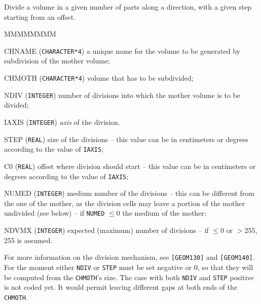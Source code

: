                


Divide a volume in a given number of parts along a direction, with
a given step starting from an offset.

\begin{DLtt}{MMMMMMMM}
\item[CHNAME] ({\tt CHARACTER*4}) a unique name for the volume to be generated
by subdivision of the mother volume;
\item[CHMOTH] ({\tt CHARACTER*4}) volume that has to be subdivided;
\item[NDIV] ({\tt INTEGER}) number of divisions into which the mother volume
is to be divided;
\item[IAXIS] ({\tt INTEGER}) {\it axis} of the division.
\item[STEP] ({\tt REAL}) size of the divisions -- this value can be in
centimeters or degrees according to the value of {\tt IAXIS};
\item[C0] ({\tt REAL}) offset where division should start -- this value can be 
in centimeters or degrees according to the value of {\tt IAXIS};
\item[NUMED] ({\tt INTEGER}) medium number of the divisions -- this can be
different from the one of the mother, as the division cells may leave a
portion of the mother undivided (see below) --
if {\tt NUMED} $\leq 0$  the medium of the mother;
\item[NDVMX] ({\tt INTEGER}) expected (maximum) number of divisions -- if
$ \leq 0 $ or $ > 255 $, 255 is assumed.
\end{DLtt}

For more information on the division mechanism, see {\tt [GEOM130]} and
{\tt [GEOM140]}. For the moment either
{\tt NDIV} or {\tt STEP} must be set negative or 0, so that they
will be computed from the {\tt CHMOTH}'s size.
The case with both {\tt NDIV} and {\tt STEP}
positive is not coded yet. It would permit leaving different
gaps at both ends of the
{\tt CHMOTH}.

